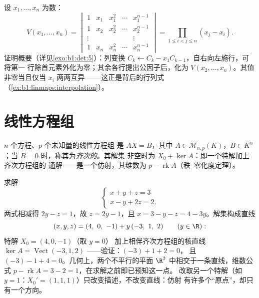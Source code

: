 \begin{example}[范德蒙德行列式]\label{ex:b1:det:vandermonde}
设 $x_1, \dots, x_n$ 为数：
\[
V(x_1, \dots, x_n) =
\begin{vmatrix}
1 & x_1 & x_1^2 & \cdots & x_1^{n-1}\\
1 & x_2 & x_2^2 & \cdots & x_2^{n-1}\\
\vdots & & & & \vdots\\
1 & x_n & x_n^2 & \cdots & x_n^{n-1}
\end{vmatrix}
= \prod_{1 \leq i < j \leq n} (x_j - x_i) .
\]
证明概要（详见\cref{exo:b1:det:5}）：列变换
$C_k \leftarrow C_k - x_1 C_{k-1}$，自右向左施行，可将第一
行除首元素外化为零；其余各行提出公因子后，化为
$V(x_2, \dots, x_n)$。其值非零当且仅当 $x_i$ 两两互异
——这正是背后的行列式
（\cref{ex:b1:linmaps:interpolation}）。
\end{example}

\section{线性方程组}

\begin{definition}\label{def:b1:det:system}
$n$ 个方程、$p$ 个未知量的线性方程组
是 $AX = B$，其中 $A \in \mathcal{M}_{n,p}(K)$，$B \in
K^n$；当 $B = 0$ 时，称其为\emph{齐次的}。其解集
非空时为 $X_0 + \ker A$：即一个特解加上齐次方程组的
通解——是一个仿射，其维数为 $p -
\operatorname{rk} A$（秩--零化度定理）。
\end{definition}

\begin{example}[仿射结构的直观展示]
\label{ex:b1:det:affinestructure}
求解
\[
\begin{cases}
x + y + z = 3\\
x - y + 2z = 2 .
\end{cases}
\]
两式相减得 $2y - z = 1$，故 $z = 2y - 1$，且 $x =
3 - y - z = 4 - 3y$。解集构成直线
\[
(x, y, z) = (4,\ 0,\ -1) + y\,(-3,\ 1,\ 2)
\qquad (y \in \R):
\]
特解 $X_0 = (4, 0, -1)$（取 $y = 0$）
加上相伴齐次方程组的核直线 $\ker A = \operatorname{Vect}(-3, 1, 2)$
——验证：$(-3) + 1 + 2 = 0$，
且 $(-3) - 1 + 4 = 0$。几何上，两个不平行的平面
$\R^3$ 中相交于一条直线，维数公式 $p -
\operatorname{rk} A = 3 - 2 = 1$，在求解之前即已预知这一点。
改取另一个特解（如 $y = 1$：$X_0' =
(1, 1, 1)$）只改变描述，不改变直线：仿射
有许多个“原点”，却只有一个方向。
\end{example}

